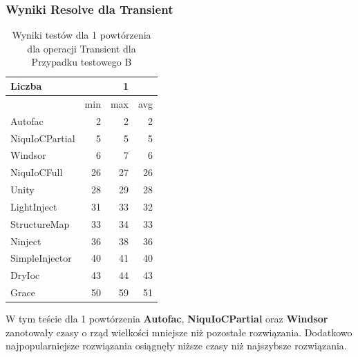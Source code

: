 \documentclass[12pt]{article}
\begin{document}
\subsubsection{Wyniki Resolve dla Transient}
\begin{table}[H]
\captionsetup{belowskip=0pt,aboveskip=0pt}
\begin{center}
\begin{small}
	\begin{tabular}{ | l | r r r | }
    		\hline
Liczba & & 1 & \\ \hline
 & min & max & avg \\ \hline
Autofac & 2 & 2 & 2 \\ \hline
NiquIoCPartial & 5 & 5 & 5 \\ \hline
Windsor & 6 & 7 & 6 \\ \hline
NiquIoCFull & 26 & 27 & 26 \\ \hline
Unity & 28 & 29 & 28 \\ \hline
LightInject & 31 & 33 & 32 \\ \hline
StructureMap & 33 & 34 & 33 \\ \hline
Ninject & 36 & 38 & 36 \\ \hline
SimpleInjector & 40 & 41 & 40 \\ \hline
DryIoc & 43 & 44 & 43 \\ \hline
Grace & 50 & 59 & 51 \\ \hline
  	\end{tabular}
\end{small}
\end{center}
\caption{Wyniki testów dla 1 powtórzenia dla operacji Transient dla Przypadku testowego B}
\label{TestCaseB_Transient1}
\end{table}
W tym teście dla 1 powtórzenia \textbf{Autofac}, \textbf{NiquIoCPartial} oraz \textbf{Windsor} zanotowały czasy o rząd wielkości mniejsze niż pozostałe rozwiązania. Dodatkowo najpopularniejsze rozwiązania osiągnęły niższe czasy niż najszybsze rozwiązania.
\\ \\
\end{document}
